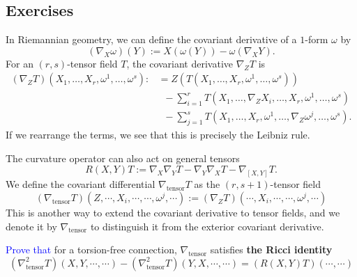 
\newpage
\subsection*{Exercises}
\begin{exercise}
    In Riemannian geometry, we can define the covariant derivative of a $1$-form $\omega$ by
    \begin{equation*}
        (\nabla_X \omega)(Y) := X(\omega(Y)) - \omega(\nabla_X Y).
    \end{equation*}
    For an $(r,s)$-tensor field $T$, the covariant derivative $\nabla_Z T$ is 
    \begin{align*}
        (\nabla_Z T)(X_1,\ldots,X_r,\omega^1,\ldots,\omega^s):&= Z(T(X_1,\ldots,X_r,\omega^1,\ldots,\omega^s)) \\ 
        &\;\;- \sum_{i=1}^r T(X_1,\ldots,\nabla_Z X_i,\ldots,X_r,\omega^1,\ldots,\omega^s) \\
        &\;\;- \sum_{j=1}^s T(X_1,\ldots,X_r,\omega^1,\ldots,\nabla_Z \omega^j,\ldots,\omega^s).
    \end{align*}
    If we rearrange the terms, we see that this is precisely the Leibniz rule. 

    The curvature operator can also act on general tensors
    \begin{equation*}
        R(X,Y)T:= \nabla_X \nabla_Y T - \nabla_Y \nabla_X T - \nabla_{[X,Y]} T.
    \end{equation*}
    We define the covariant differential $\nabla_{\text{tensor}} T$ as the $(r,s+1)$-tensor field
    \begin{equation*}
        (\nabla_{\text{tensor}} T)(Z,\cdots,X_i,\cdots,\cdots,\omega^j,\cdots)
        := (\nabla_Z T)(\cdots,X_i,\cdots,\cdots,\omega^j,\cdots)
    \end{equation*}
    This is another way to extend the covariant derivative to tensor fields, 
    and we denote it by $\nabla_{\text{tensor}}$ to distinguish it from the exterior covariant derivative.

    \textcolor{blue}{Prove that} for a torsion-free connection, $\nabla_{\text{tensor}}$ satisfies \textbf{the Ricci identity}
    \begin{equation*}
        (\nabla_{\text{tensor}}^2 T)(X,Y,\cdots,\cdots) - (\nabla_{\text{tensor}}^2 T)(Y,X,\cdots,\cdots) = (R(X,Y)T)(\cdots,\cdots)
    \end{equation*}
\end{exercise}

